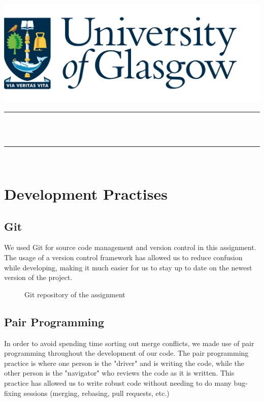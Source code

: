 \documentclass[a4paper,12pt]{article}
\makeatletter
\def\maketitle{
  \begin{center}\leavevmode
       \normalfont
       \includegraphics[width=1\columnwidth]{UoG Logo Transparent BG.png}
       \vskip 1.5cm   
       \textsc{\large \department}\\
       \vskip 1.5cm
       \rule{\linewidth}{0.3 mm} \\
       \vskip 0.5cm
       {\large \course}\\[1 cm]
       {\huge \bfseries \@title \par}
       \vspace{0.7cm}
	\rule{\linewidth}{0.2 mm} \\[1.5 cm]
	
    \textbf{\large \@author}
	\vskip 0.5cm
	\textbf{\studentID}	
	

	\vfill
	{\Large \@date\par}
   \end{center}
   \cleardoublepage
  }
\makeatother
\begin{document}

\maketitle

\clearpage
\tableofcontents
\clearpage




\section{Development Practises}
\subsection{Git}
We used Git for source code management and version control in this assignment. The usage of a version control framework has allowed us to reduce confusion while developing, making it much easier for us to stay up to date on the newest version of the project. 
\newline

\begin{figure}[H]
\caption{Git repository of the assignment}
\end{figure}

\subsection{Pair Programming}
In order to avoid spending time sorting out merge conflicts, we made use of pair programming throughout the development of our code. The pair programming practice is where one person is the "driver" and is writing the code, while the other person is the "navigator" who reviews the code as it is written.\cite{pairprogramming} This practice has allowed us to write robust code without needing to do many bug-fixing sessions (merging, rebasing, pull requests, etc.)
\clearpage

\begin{thebibliography}{9}
\bibitem{}


\end{thebibliography}
\end{document}
